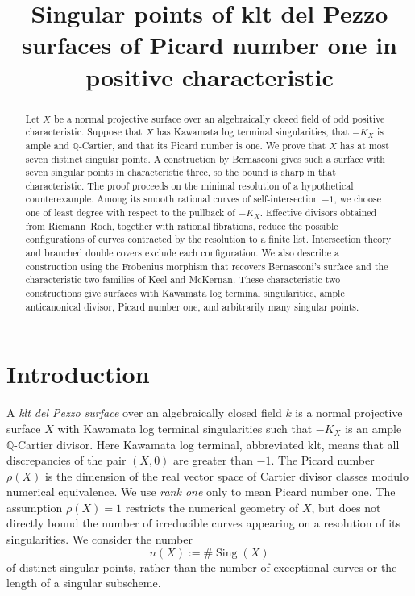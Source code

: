 \documentclass[11pt,reqno]{amsart}
\title[Singular points of klt del Pezzo surfaces]{Singular points of klt del Pezzo surfaces of Picard number one in positive characteristic}
\date{}
\theoremstyle{definition}
\theoremstyle{remark}
\DeclareMathOperator{\Sing}{Sing}
\newcommand{\QQ}{\mathbb Q}
\numberwithin{equation}{section}
\begin{document}
\begin{abstract}
Let $X$ be a normal projective surface over an algebraically closed field
of odd positive characteristic. Suppose that $X$ has Kawamata log
terminal singularities, that $-K_X$ is ample and $\QQ$-Cartier, and that
its Picard number is one. We prove that $X$ has at most seven distinct
singular points. A construction by Bernasconi gives such a surface with
seven singular points in characteristic three, so the bound is sharp
in that characteristic. The proof proceeds on the minimal resolution
of a hypothetical counterexample. Among its smooth rational curves of
self-intersection $-1$, we choose one of least degree with respect to
the pullback of $-K_X$. Effective divisors obtained from Riemann--Roch,
together with rational fibrations, reduce the possible configurations
of curves contracted by the resolution to a finite list. Intersection theory and
branched double covers exclude each configuration. We also describe a
construction using the Frobenius morphism that recovers Bernasconi's
surface and the characteristic-two families of Keel and McKernan.
These characteristic-two constructions give surfaces with Kawamata log
terminal singularities, ample anticanonical divisor, Picard number one,
and arbitrarily many singular points.
\end{abstract}
\maketitle

\section{Introduction}\label{sec:introduction}
A \emph{klt del Pezzo surface} over an algebraically closed field $k$ is a
normal projective surface $X$ with Kawamata log terminal singularities
such that $-K_X$ is an ample $\QQ$-Cartier divisor. Here Kawamata log
terminal, abbreviated klt, means that all discrepancies of the pair
$(X,0)$ are greater than $-1$. The Picard number $\rho(X)$ is the dimension
of the real vector space of Cartier divisor classes modulo numerical
equivalence. We use \emph{rank one} only to mean Picard number one. The assumption
$\rho(X)=1$ restricts the numerical geometry
of $X$, but does not directly bound the number of irreducible curves
appearing on a resolution of its singularities. We consider the number
\[
 n(X):=\#\Sing(X)
\]
of distinct singular points, rather than the number of exceptional
curves or the length of a singular subscheme.
\end{document}
